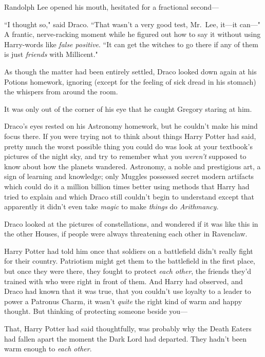 Randolph Lee opened his mouth, hesitated for a fractional second---

``I thought so," said Draco. ``That wasn't a very good test, Mr.~Lee, it---it can---" A frantic, nerve-racking moment while he figured out how to say it without using Harry-words like \emph{false positive}. ``It can get the witches to go there if any of them is just \emph{friends} with Millicent."

As though the matter had been entirely settled, Draco looked down again at his Potions homework, ignoring (except for the feeling of sick dread in his stomach) the whispers from around the room.

It was only out of the corner of his eye that he caught Gregory staring at him.

\later

Draco's eyes rested on his Astronomy homework, but he couldn't make his mind focus there. If you were trying not to think about things Harry Potter had said, pretty much the worst possible thing you could do was look at your textbook's pictures of the night sky, and try to remember what you \emph{weren't} supposed to know about how the planets wandered. Astronomy, a noble and prestigious art, a sign of learning and knowledge; only Muggles possessed secret modern artifacts which could do it a million billion times better using methods that Harry had tried to explain and which Draco still couldn't begin to understand except that apparently it didn't even take \emph{magic} to make \emph{things} do \emph{Arithmancy.}

Draco looked at the pictures of constellations, and wondered if it was like this in the other Houses, if people were always threatening each other in Ravenclaw.

Harry Potter had told him once that soldiers on a battlefield didn't really fight for their country. Patriotism might get them to the battlefield in the first place, but once they were there, they fought to protect \emph{each other}, the friends they'd trained with who were right in front of them. And Harry had observed, and Draco had known that it was true, that you couldn't use loyalty to a leader to power a Patronus Charm, it wasn't \emph{quite} the right kind of warm and happy thought. But thinking of protecting someone beside you---

That, Harry Potter had said thoughtfully, was probably why the Death Eaters had fallen apart the moment the Dark Lord had departed. They hadn't been warm enough to \emph{each other}.

